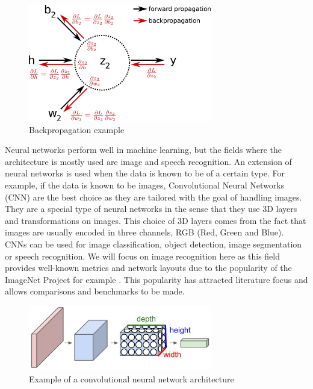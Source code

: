 \begin{figure}[htbp]
	\centering
		\includegraphics[width=8cm]{Figures/backpropagation.png}
	\caption[Backpropagation example]{Backpropagation example}
	\label{fig:Backpropagation}
\end{figure}

Neural networks perform well in machine learning, but the fields where the architecture is mostly used are image and speech recognition. An extension of neural networks is used when the data is known to be of a certain type. For example, if the data is known to be images, Convolutional Neural Networks (CNN) are the best choice as they are tailored with the goal of handling images. They are a special type of neural networks in the sense that they use 3D layers and transformations on images. This choice of 3D layers comes from the fact that images are usually encoded in three channels, RGB (Red, Green and Blue). CNNs can be used for image classification, object detection, image segmentation or speech recognition. We will focus on image recognition here as this field provides well-known metrics and network layouts due to the popularity of the ImageNet Project for example \cite{ImageNet2009}. This popularity has attracted literature focus and allows comparisons and benchmarks to be made.

\begin{figure}[htbp]
	\centering
		\includegraphics[width=8cm]{Figures/CNN.png}
	\caption[Convolutional Neural Network Example]{Example of a convolutional neural network architecture \cite{Karpathy2015}}
	\label{fig:CNN}
\end{figure}

